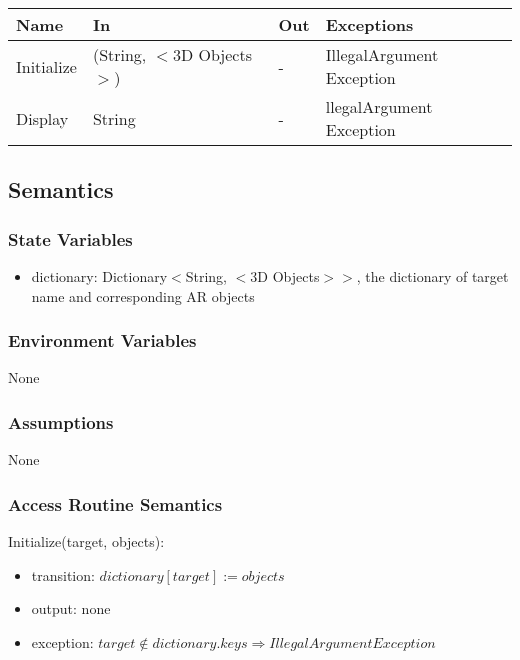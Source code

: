 \documentclass[12pt, titlepage]{article}
\begin{document}
\begin{center}
\begin{tabular}{p{2cm} p{4cm} p{4cm} p{2cm}}
\hline
\textbf{Name} & \textbf{In} & \textbf{Out} & \textbf{Exceptions} \\
\hline
Initialize & (String, $<$3D Objects$>$) & - & IllegalArgument Exception\\
Display & String & - & llegalArgument Exception \\

\hline
\end{tabular}
\end{center}

\subsection{Semantics}

\subsubsection{State Variables}

\begin{itemize}
\item dictionary: Dictionary$<$String, $<$3D Objects$>$$>$, the dictionary of target name and corresponding AR objects
\end{itemize}

\subsubsection{Environment Variables}

None

\subsubsection{Assumptions}

None

\subsubsection{Access Routine Semantics}

\noindent Initialize(target, objects):
\begin{itemize}
\item transition: $dictionary[target] := objects$
\item output: none
\item exception: $target \notin dictionary.keys \Rightarrow IllegalArgument Exception$
\end{itemize}
\end{document}
